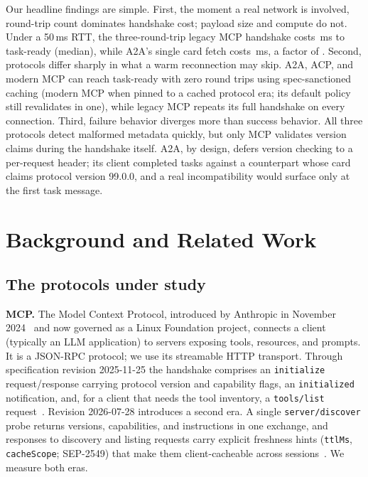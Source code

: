 \documentclass[10pt]{article}
\newcommand{\code}[1]{\mbox{\texttt{#1}}}
\begin{document}
Our headline findings are simple. First, the moment a real network is
involved, round-trip count dominates handshake cost; payload size and
compute do not. Under a 50\,ms RTT, the three-round-trip legacy MCP
handshake costs \SOneMcpLegacyRttMed{}\,ms to task-ready (median), while
A2A's single card fetch costs \SOneAtoaRttMed{}\,ms, a factor of
\HeadlineColdRatio{}. Second, protocols differ sharply in what a warm
reconnection may skip. A2A, ACP, and modern MCP can reach task-ready with
zero round trips using spec-sanctioned caching (modern MCP when pinned to
a cached protocol era; its default policy still revalidates in one),
while legacy MCP repeats its full handshake on every connection. Third,
failure behavior diverges more than success behavior. All three protocols
detect malformed metadata quickly, but only MCP validates version claims
during the handshake itself. A2A, by design, defers version checking to a
per-request header; its client completed tasks against a counterpart
whose card claims protocol version 99.0.0, and a real incompatibility
would surface only at the first task message.

\section{Background and Related Work}
\label{sec:background}

\subsection{The protocols under study}

\textbf{MCP.} The Model Context Protocol, introduced by Anthropic in
November 2024~\citep{anthropic2024mcp} and now governed as a Linux
Foundation project, connects a client (typically an LLM application) to
servers exposing tools, resources, and prompts. It is a JSON-RPC
protocol; we use its streamable HTTP transport. Through specification
revision 2025-11-25 the handshake comprises an \code{initialize}
request/response carrying protocol version and capability flags, an
\code{initialized} notification, and, for a client that needs the tool
inventory, a \code{tools/list} request~\citep{mcpspec2025}. Revision
2026-07-28 introduces a second era. A single \code{server/discover}
probe returns versions, capabilities, and instructions in one exchange,
and responses to discovery and listing requests carry explicit freshness
hints (\code{ttlMs}, \code{cacheScope}; SEP-2549) that make them
client-cacheable across sessions~\citep{mcpspec2026}. We measure both
eras.
\end{document}
